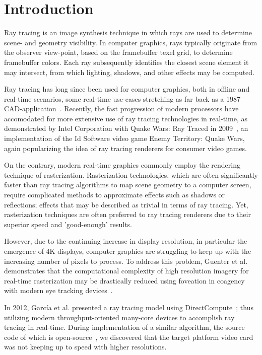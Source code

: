 \section{Introduction}
Ray tracing is an image synthesis technique in which rays are used to determine scene- and geometry visibility.
In computer graphics, rays typically originate from the observer view-point, based on the framebuffer texel grid, to determine framebuffer colors.
Each ray subsequently identifies the closest scene element it may intersect, from which lighting, shadows, and other effects may be computed.

Ray tracing has long since been used for computer graphics, both in offline and real-time scenarios, some real-time use-cases stretching as far back as a 1987 CAD-application~\cite{stay87}.
Recently, the fast progression of modern processors have accomodated for more extensive use of ray tracing technologies in real-time, as demonstrated by Intel Corporation with Quake Wars: Ray Traced in 2009~\cite{pohl09}, an implementation of the Id Software video game Enemy Territory: Quake Wars, again popularizing the idea of ray tracing renderers for consumer video games.

On the contrary, modern real-time graphics commonly employ the rendering technique of rasterization.
Rasterization technologies, which are often significantly faster than ray tracing algorithms to map scene geometry to a computer screen, require complicated methods to approximate effects such as shadows or reflections; effects that may be described as trivial in terms of ray tracing.
Yet, rasterization techniques are often preferred to ray tracing renderers due to their superior speed and 'good-enough' results.

However, due to the continuing increase in display resolution, in particular the emergence of 4K displays, computer graphics are struggling to keep up with the increasing number of pixels to process.
To address this problem, Guenter et al. demonstrates that the computational complexity of high resolution imagery for real-time rasterization may be drastically reduced using foveation in coagency with modern eye tracking devices~\cite{guenter12}.

In 2012, Garc\'ia et al. presented a ray tracing model using DirectCompute~\cite{garcia12}; thus utilizing modern throughput-oriented many-core devices to accomplish ray tracing in real-time.
During implementation of a similar algorithm, the source code of which is open-source~\cite{raytracer}, we discovered that the target platform video card was not keeping up to speed with higher resolutions.

